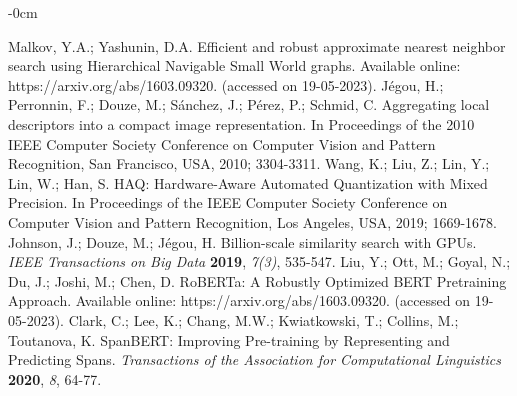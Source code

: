 \documentclass[mathematics,article,submit,moreauthors]{Definitions/mdpi}
\newcommand{\1}[1]{\mathds{1}\left[#1\right]}
\begin{document}
\begin{adjustwidth}{-\extralength}{0cm}
\begin{thebibliography}{999}
	Malkov, Y.A.; Yashunin, D.A. Efficient and robust approximate nearest neighbor search using Hierarchical Navigable Small World graphs. Available online: https://arxiv.org/abs/1603.09320. (accessed on 19-05-2023).
	Jégou, H.; Perronnin, F.; Douze, M.; Sánchez, J.; Pérez, P.; Schmid, C. Aggregating local descriptors into a compact image representation. In Proceedings of the 2010 IEEE Computer Society Conference on Computer Vision and Pattern Recognition, San Francisco, USA, 2010; 3304-3311.
	Wang, K.; Liu, Z.; Lin, Y.; Lin, W.; Han, S. HAQ: Hardware-Aware Automated Quantization with Mixed Precision. In Proceedings of  the IEEE Computer Society Conference on Computer Vision and Pattern Recognition, Los Angeles, USA, 2019; 1669-1678.	
	Johnson, J.; Douze, M.; Jégou, H. Billion-scale similarity search with GPUs. {\em IEEE Transactions on Big Data} {\bf 2019}, {\em 7(3)}, 535-547.	
	Liu, Y.; Ott, M.; Goyal, N.; Du, J.; Joshi, M.; Chen, D. RoBERTa: A Robustly Optimized BERT Pretraining Approach. Available online: https://arxiv.org/abs/1603.09320. (accessed on 19-05-2023).
	Clark, C.; Lee, K.; Chang, M.W.; Kwiatkowski, T.; Collins, M.; Toutanova, K. SpanBERT: Improving Pre-training by Representing and Predicting Spans. {\em Transactions of the Association for Computational Linguistics} {\bf 2020}, {\em 8}, 64-77.

\end{thebibliography}
\end{adjustwidth}
\end{document}
